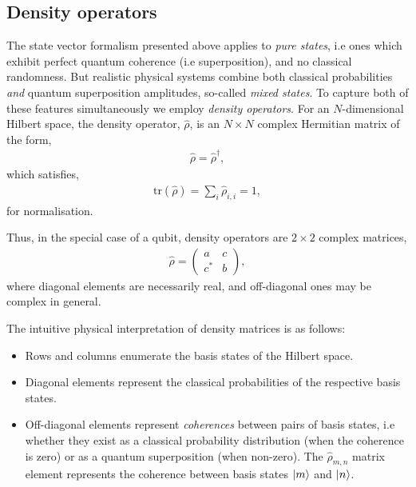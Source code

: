 %
%

\subsection{Density operators}

The state vector formalism presented above applies to \textit{pure states}, i.e ones which exhibit perfect quantum coherence (i.e superposition), and no classical randomness. But realistic physical systems combine both classical probabilities \textit{and} quantum superposition amplitudes, so-called \textit{mixed states}. To capture both of these features simultaneously we employ \textit{density operators}. For an $N$-dimensional Hilbert space, the density operator, $\hat\rho$, is an \mbox{$N\times N$} complex Hermitian matrix of the form,
\begin{align}
	\hat\rho = \hat\rho^\dag,
\end{align}
which satisfies,
\begin{align}
\mathrm{tr}(\hat\rho)=\sum_i \hat\rho_{i,i} = 1,	
\end{align}
for normalisation.

Thus, in the special case of a qubit, density operators are \mbox{$2\times 2$} complex matrices,
\begin{align}
\hat\rho = \left(\begin{matrix}{}
  a & c \nonumber\\
  c^* & b
\end{matrix}\right),
\end{align}
where diagonal elements are necessarily real, and off-diagonal ones may be complex in general.

The intuitive physical interpretation of density matrices is as follows:
\begin{itemize}
\item Rows and columns enumerate the basis states of the Hilbert space.
\item Diagonal elements represent the classical probabilities of the respective basis states.
\item Off-diagonal elements represent \textit{coherences} between pairs of basis states, i.e whether they exist as a classical probability distribution (when the coherence is zero) or as a quantum superposition (when non-zero). The $\hat\rho_{m,n}$ matrix element represents the coherence between basis states $|m\rangle$ and $|n\rangle$.
\end{itemize}

